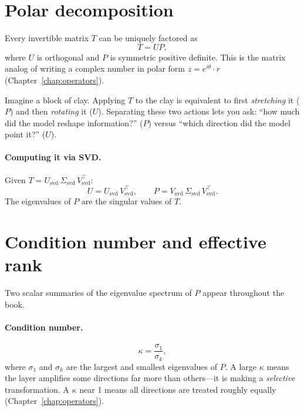 \documentclass[11pt, twoside, openright]{memoir}
\begin{document}
\section{Polar decomposition}
\label{sec:polar}

Every invertible matrix $T$ can be uniquely factored as
\[
  T = U P,
\]
where $U$ is orthogonal and $P$ is symmetric positive definite.  This is
the matrix analog of writing a complex number in polar form
$z = e^{i\theta} \cdot r$ (Chapter~\ref{chap:operators}).

\begin{analogy}
Imagine a block of clay.  Applying $T$ to the clay is equivalent to first
\emph{stretching} it ($P$) and then \emph{rotating} it ($U$).
Separating these two actions lets you ask: ``how much did the model
reshape information?'' ($P$) versus ``which direction did the model point
it?'' ($U$).
\end{analogy}

\paragraph{Computing it via SVD.}
Given $T = U_{\mathrm{svd}}\,\Sigma_{\mathrm{svd}}\,V_{\mathrm{svd}}^\top$:
\[
  U = U_{\mathrm{svd}}\, V_{\mathrm{svd}}^\top, \qquad
  P = V_{\mathrm{svd}}\, \Sigma_{\mathrm{svd}}\, V_{\mathrm{svd}}^\top.
\]
The eigenvalues of $P$ are the singular values of $T$.

\section{Condition number and effective rank}
\label{sec:condition-rank}

Two scalar summaries of the eigenvalue spectrum of $P$ appear throughout
the book.

\paragraph{Condition number.}
\[
  \kappa = \frac{\sigma_1}{\sigma_k},
\]
where $\sigma_1$ and $\sigma_k$ are the largest and smallest eigenvalues
of $P$.  A large $\kappa$ means the layer amplifies some directions far
more than others---it is making a \emph{selective} transformation.  A
$\kappa$ near 1 means all directions are treated roughly equally
(Chapter~\ref{chap:operators}).
\end{document}
